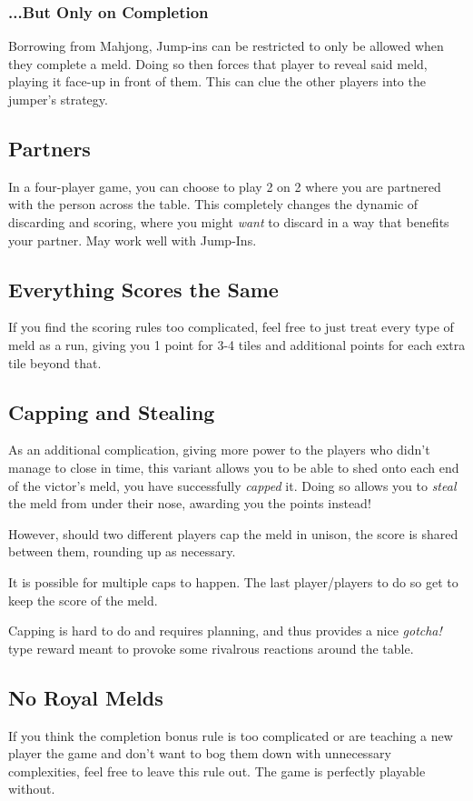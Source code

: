 \subsubsection{...But Only on Completion}\label{sec:jump-in}
Borrowing from Mahjong, Jump-ins can be restricted to only be allowed when they complete a meld. 
Doing so then forces that player to reveal said meld, playing it face-up in front of them. This can clue the other players into the jumper's strategy.

\subsection{Partners}
In a four-player game, you can choose to play 2 on 2 where you are partnered with the person across the table.
This completely changes the dynamic of discarding and scoring, where you might \textit{want} to discard in a way that benefits your partner. May work well with Jump-Ins.

\subsection{Everything Scores the Same}
If you find the scoring rules too complicated, feel free to just treat every type of meld as a run, giving you 1 point for 3-4 tiles and additional points for each extra tile beyond that.

\subsection{Capping and Stealing}
As an additional complication, giving more power to the players who didn't manage to close in time, this variant allows you to be able to shed onto each end of the victor's meld, you have successfully \textit{capped} it. Doing so allows you to \textit{steal} the meld from under their nose, awarding you the points instead!

However, should two different players cap the meld in unison, the score is shared between them, rounding up as necessary.

\note It is possible for multiple caps to happen. The last player/players to do so get to keep the score of the meld.

\aside Capping is hard to do and requires planning, and thus provides a nice \textit{gotcha!} type reward meant to provoke some rivalrous reactions around the table.

\subsection{No Royal Melds}
If you think the completion bonus rule is too complicated or are teaching a new player the game and don't want to bog them down with unnecessary complexities, feel free to leave this rule out.
The game is perfectly playable without.

